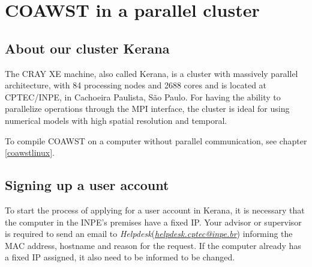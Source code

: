 
\chapter{COAWST in a parallel cluster}
\bigskip

\section{About our cluster Kerana}
\bigskip

\noindent The CRAY XE machine, also called Kerana, is a cluster with massively parallel architecture, with 84 processing nodes and 2688 cores and is located at CPTEC/INPE,
in Cachoeira Paulista, São Paulo. For having the ability to parallelize operations through the MPI interface, the cluster is ideal for using numerical models with high spatial resolution
and temporal.
\bigskip

\begin{tcolorbox}[enhanced,
  grow to left by   = 0cm,
  grow to right by  = 0cm,
  enlarge top by    = 0cm,
  enlarge bottom by = 0cm,
  tcbox raise base,
  boxrule           = 1.0pt,
  left              = 18mm,
  colframe          = red!50!black,coltext=red!25!black,colback=red!10!white,
  overlay           = {\begin{tcbclipinterior}\fill[red!75!blue!50!white] (frame.south west)
    rectangle node[text=white,font=\sffamily\bfseries\footnotesize,rotate=0] {WARNING} ([xshift=18mm]frame.north west);\end{tcbclipinterior}}]
    To compile COAWST on a computer without parallel communication, see chapter \textcolor{bleu_cite}{\ref{coawstlinux}}.
\end{tcolorbox}
\bigskip

\section{Signing up a user account}
\bigskip

\noindent To start the process of applying for a user account in Kerana, it is necessary that the computer in the INPE's premises have a fixed IP. Your advisor or supervisor 
is required to send an email to \textit{Helpdesk}(\textcolor{bleu_cite}{\href{helpdesk.cptec@inpe.br}{\textit{helpdesk.cptec@inpe.br}}}) informing the MAC address, hostname
and reason for the request. If the computer already has a fixed IP assigned, it also need to be informed to be changed.
\bigskip

